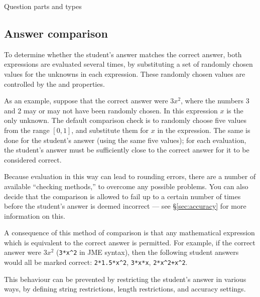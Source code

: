 \begin{chapter}{\label{cha:question_parts}Question parts and types}
  \subsection{\label{sec:answer_comparison}Answer comparison}
  To determine whether the student's answer matches the correct answer, both
  expressions are evaluated several times, by substituting a set of randomly
  chosen values for the unknowns in each expression.  These randomly chosen
  values are controlled by the  and
   properties.

  As an example, suppose that the correct answer were $3x^{2}$, where the numbers 3 and 2
  may or may not have been randomly chosen.  In this expression $x$ is the only
  unknown.  The default comparison check is to randomly choose five values from
  the range $[0,1]$, and substitute them for $x$ in the expression.  The same
  is done for the student's answer (using the same five values); for each
  evaluation, the student's answer must be sufficiently close to the correct
  answer for it to be considered correct.

  Because evaluation in this way can lead to rounding errors, there are a
  number of available ``checking methods,'' to overcome any possible problems.
  You can also decide that the comparison is allowed to fail up to a certain number
  of times before the student's answer is deemed incorrect --- see
  \S\ref{sec:accuracy} for more information on this.

  A consequence of this method of comparison is that any mathematical
  expression which is equivalent to the correct answer is permitted.  For
  example, if the correct answer were $3x^{2}$ (\verb"3*x^2" in JME syntax),
  then the following student answers would all be marked correct:
  \verb"2*1.5*x^2", \verb"3*x*x", \verb"2*x^2+x^2".

  This behaviour can be prevented by restricting the student's answer in
  various ways, \eg by defining string restrictions, length restrictions, and
  accuracy settings.


\end{chapter}
